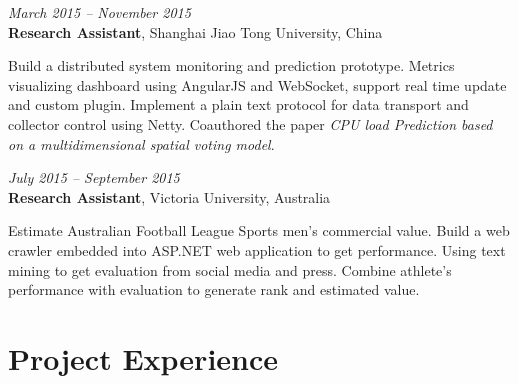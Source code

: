 \documentclass[fontsize=10pt]{tccv}
\begin{document}
\begin{eventlist}


\textit{March 2015 -- November 2015} \\
\textbf{Research Assistant}, Shanghai Jiao Tong University, China\smallskip

Build a distributed system monitoring and prediction prototype.
Metrics visualizing dashboard using AngularJS and WebSocket, support real time update and custom plugin.
Implement a plain text protocol for data transport and collector control using Netty.
Coauthored the paper \textit{CPU load Prediction based on a multidimensional spatial voting model}.

\medskip


\textit{July 2015 -- September 2015} \\
\textbf{Research Assistant}, Victoria University, Australia\smallskip

Estimate Australian Football League Sports men's commercial value.
Build a web crawler embedded into ASP.NET web application to get performance.
Using text mining to get evaluation from social media and press.
Combine athlete's performance with evaluation to generate rank and estimated value.

\end{eventlist}

\section{Project Experience}
\end{document}
